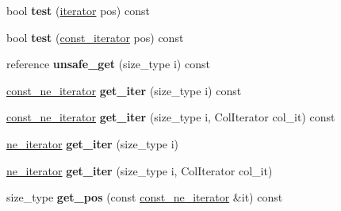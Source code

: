 \begin{DoxyCompactItemize}
\item 
bool {\bfseries test} (\hyperlink{classspp___1_1table__iterator}{iterator} pos) const \hypertarget{classspp___1_1sparsetable_ade7f422838af36e733e646035b1fb7e3}{}\label{classspp___1_1sparsetable_ade7f422838af36e733e646035b1fb7e3}

\item 
bool {\bfseries test} (\hyperlink{classspp___1_1const__table__iterator}{const\+\_\+iterator} pos) const \hypertarget{classspp___1_1sparsetable_ae69633c59391d5ec5cc1bc4de8fa690a}{}\label{classspp___1_1sparsetable_ae69633c59391d5ec5cc1bc4de8fa690a}

\item 
reference {\bfseries unsafe\+\_\+get} (size\+\_\+type i) const \hypertarget{classspp___1_1sparsetable_aa7c91d23602f1e22da5d80c15663182d}{}\label{classspp___1_1sparsetable_aa7c91d23602f1e22da5d80c15663182d}

\item 
\hyperlink{classspp___1_1_two__d__iterator}{const\+\_\+ne\+\_\+iterator} {\bfseries get\+\_\+iter} (size\+\_\+type i) const \hypertarget{classspp___1_1sparsetable_a90f50103e4cee9fc9e5c4bc8f0f7e451}{}\label{classspp___1_1sparsetable_a90f50103e4cee9fc9e5c4bc8f0f7e451}

\item 
\hyperlink{classspp___1_1_two__d__iterator}{const\+\_\+ne\+\_\+iterator} {\bfseries get\+\_\+iter} (size\+\_\+type i, Col\+Iterator col\+\_\+it) const \hypertarget{classspp___1_1sparsetable_ad69322c1f63f6ff373ab11812af8c9c5}{}\label{classspp___1_1sparsetable_ad69322c1f63f6ff373ab11812af8c9c5}

\item 
\hyperlink{classspp___1_1_two__d__iterator}{ne\+\_\+iterator} {\bfseries get\+\_\+iter} (size\+\_\+type i)\hypertarget{classspp___1_1sparsetable_a7b8dbb20016470f4700e86cf804a25d1}{}\label{classspp___1_1sparsetable_a7b8dbb20016470f4700e86cf804a25d1}

\item 
\hyperlink{classspp___1_1_two__d__iterator}{ne\+\_\+iterator} {\bfseries get\+\_\+iter} (size\+\_\+type i, Col\+Iterator col\+\_\+it)\hypertarget{classspp___1_1sparsetable_ae556523e23ce25e6becf683bc572cabe}{}\label{classspp___1_1sparsetable_ae556523e23ce25e6becf683bc572cabe}

\item 
size\+\_\+type {\bfseries get\+\_\+pos} (const \hyperlink{classspp___1_1_two__d__iterator}{const\+\_\+ne\+\_\+iterator} \&it) const \hypertarget{classspp___1_1sparsetable_a26dac17b400b1348515d53f43b462377}{}\label{classspp___1_1sparsetable_a26dac17b400b1348515d53f43b462377}


\end{DoxyCompactItemize}
